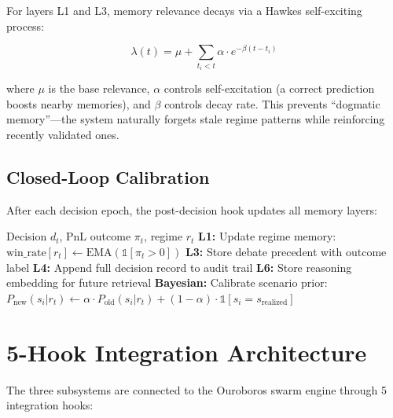 \documentclass[11pt, a4paper]{article}
\begin{document}
For layers L1 and L3, memory relevance decays via a Hawkes self-exciting process:

\begin{equation}
  \lambda(t) = \mu + \sum_{t_i < t} \alpha \cdot e^{-\beta(t - t_i)}
\end{equation}

where $\mu$ is the base relevance, $\alpha$ controls self-excitation (a correct prediction boosts nearby memories), and $\beta$ controls decay rate. This prevents ``dogmatic memory''—the system naturally forgets stale regime patterns while reinforcing recently validated ones.

\subsection{Closed-Loop Calibration}

After each decision epoch, the post-decision hook updates all memory layers:

\begin{algorithm}[H]
\caption{Post-Decision Memory Calibration}
\begin{algorithmic}[1]
\Require Decision $d_t$, PnL outcome $\pi_t$, regime $r_t$
\State \textbf{L1:} Update regime memory: $\text{win\_rate}[r_t] \leftarrow \text{EMA}(\mathbb{1}[\pi_t > 0])$
\State \textbf{L3:} Store debate precedent with outcome label
\State \textbf{L4:} Append full decision record to audit trail
\State \textbf{L6:} Store reasoning embedding for future retrieval
\State \textbf{Bayesian:} Calibrate scenario prior:
\State \quad $P_{\text{new}}(s_i | r_t) \leftarrow \alpha \cdot P_{\text{old}}(s_i | r_t) + (1-\alpha) \cdot \mathbb{1}[s_i = s_{\text{realized}}]$
\end{algorithmic}
\end{algorithm}


\section{5-Hook Integration Architecture}
\label{sec:integration}

The three subsystems are connected to the Ouroboros swarm engine through 5 integration hooks:
\end{document}
